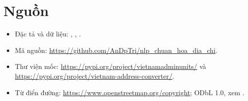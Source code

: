 \documentclass[12pt,a4paper]{article}
\begin{document}
\section*{Nguồn}
\begin{itemize}
\item Đặc tả và dữ liệu: , , .
\item Mã nguồn: \url{https://github.com/AnDpTri/nlp_chuan_hoa_dia_chi}.
\item Thư viện mốc: \url{https://pypi.org/project/vietnamadminunits/} và \url{https://pypi.org/project/vietnam-address-converter/}.
\item Từ điển đường: \url{https://www.openstreetmap.org/copyright}; ODbL 1.0, xem .
\end{itemize}
\end{document}
